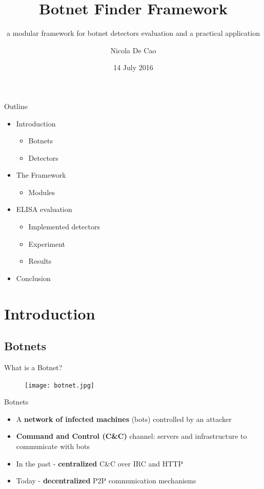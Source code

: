\documentclass{beamer}
\title{Botnet Finder Framework}
\subtitle{a modular framework for botnet detectors evaluation and a practical application}
\author{Nicola De Cao}
\date{14 July 2016}
\begin{document}
	\maketitle

	\begin{frame}{Outline}
		\begin{multicols}{2}
			\begin{itemize}
				\item Introduction
				\begin{itemize}
					\item Botnets
					\item Detectors
				\end{itemize}
				\item The Framework
				\begin{itemize}
					\item Modules
				\end{itemize}
				\item ELISA evaluation
				\begin{itemize}
					\item Implemented detectors
					\item Experiment
					\item Results
				\end{itemize}
				\item Conclusion
			\end{itemize}
		\end{multicols}
	\end{frame}

	\section{Introduction}
	
	\subsection{Botnets}
	
	\begin{frame}{What is a Botnet?}
		\begin{figure}
			\texttt{[image: botnet.jpg]}
		\end{figure}
	\end{frame}
	
	\begin{frame}{Botnets}
		\begin{itemize}
			\item A \textbf{network of infected machines} (bots) controlled by an attacker
			\item \textbf{Command and Control (C\&C)} channel: servers and infrastructure to communicate with bots
			\item In the past - \textbf{centralized} C\&C over {IRC} and {HTTP}
			\item Today - \textbf{decentralized} P2P communication mechanisms
		\end{itemize}
	\end{frame}
	
\end{document}
